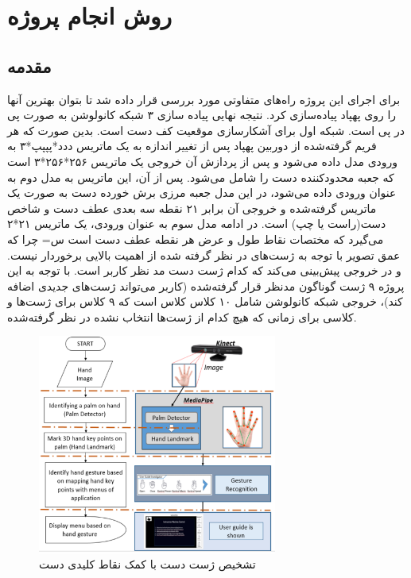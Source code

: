 \chapter{روش انجام پروژه}
\section{مقدمه}

برای اجرای این پروژه راه‌های متفاوتی مورد بررسی قرار داده شد تا بتوان بهترین آنها را روی پهپاد پیاده‌سازی کرد. نتیجه نهایی پیاده سازی ۳ شبکه کانولوشن
به صورت پی در پی است. شبکه اول برای آشکارسازی موقعیت کف دست است. بدین صورت که هر فریم گرفته‌شده از دوربین پهپاد 
پس از تغییر اندازه به یک ماتریس ددد*پپپپ*۳ به ورودی مدل داده می‌شود و پس از پردازش آن خروجی یک ماتریس ۲۵۶*۲۵۶*۳ است که جعبه محدودکننده 
دست را شامل می‌شود. پس از آن، این ماتریس به مدل دوم به عنوان ورودی داده می‌شود، در این مدل جعبه مرزی برش خورده دست به صورت یک ماتریس گرفته‌شده و خروجی آن برابر ۲۱ نقطه 
سه بعدی عطف دست و شاخص دست(راست یا چپ) است.  در ادامه مدل سوم به عنوان ورودی، یک ماتریس ۲۱*۲ می‌گیرد که مختصات نقاط  طول و عرض هر نقطه عطف دست است س=
چرا که عمق تصویر با توجه به ژست‌های در نظر گرفته شده از اهمیت بالایی برخوردار نیست. و در خروجی پیش‌بینی می‌کند که کدام ژست دست مد نظر کاربر است. با توجه به این پروژه ۹ ژست 
گوناگون مدنظر قرار گرفته‌شده (کاربر می‌تواند ژست‌های جدیدی اضافه کند)، خروجی شبکه کانولوشن شامل ۱۰ کلاس 
کلاس است که ۹ کلاس برای ژست‌ها و کلاسی برای زمانی که هیچ کدام از ژست‌ها انتخاب نشده در نظر گرفته‌شده.

\begin{figure}[h]
    \centering
    \includegraphics[width=0.7\textwidth]{gesture.png}
    \caption{تشخیص ژست دست با کمک نقاط کلیدی دست}
\end{figure}



